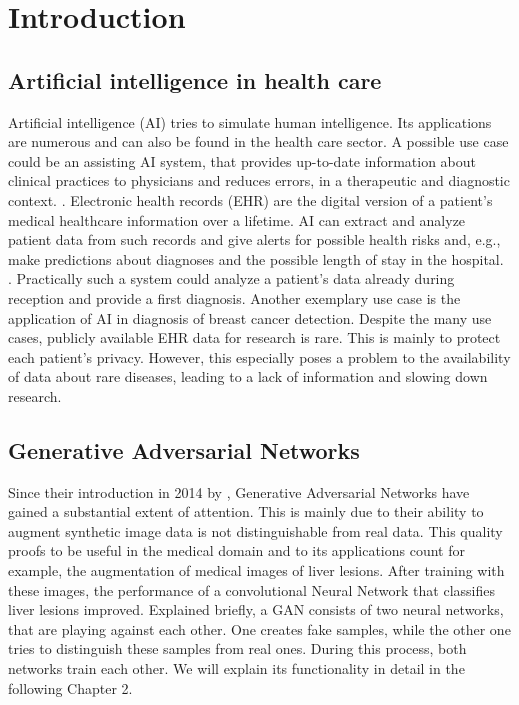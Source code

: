 \documentclass[11pt, a4paper, oneside]{book}
\begin{document}
\chapter{Introduction}

\section{Artificial intelligence in health care}
Artificial intelligence (AI) tries to simulate human intelligence. Its applications are numerous and can also be found in the health care sector. A possible use case could be an assisting AI system, that provides up-to-date information about clinical practices to physicians and reduces errors, in a therapeutic and diagnostic context. \citep{jiang2017artificial}. Electronic health records (EHR) are the digital version of a patient's medical healthcare information over a lifetime. AI can extract and analyze patient data from such records and give alerts for possible health risks and, e.g., make predictions about diagnoses and the possible length of stay in the hospital. \citep{neill2013using}. Practically such a system could analyze a patient's data already during reception and provide a first diagnosis. Another exemplary use case is the application of AI in diagnosis of breast cancer detection. \citep{ubeyli2007implementing} Despite the many use cases, publicly available EHR data for research is rare. This is mainly to protect each patient's privacy. However, this especially poses a problem to the availability of data about rare diseases, leading to a lack of information and slowing down research. \citep{bremond2015contribution}

\section{Generative Adversarial Networks}
Since their introduction in 2014 by \citep{Goodfellow2014}, Generative Adversarial Networks have gained a substantial extent of attention. This is mainly due to their ability to augment synthetic image data is not distinguishable from real data. This quality proofs to be useful in the medical domain and to its applications count for example, the augmentation of medical images of liver lesions. After training with these images, the performance of a convolutional Neural Network that classifies liver lesions improved. \citep{frid2018gan} Explained briefly, a GAN consists of two neural networks, that are playing against each other. One creates fake samples, while the other one tries to distinguish these samples from real ones. During this process, both networks train each other. \citep{Goodfellow2014} We will explain its functionality in detail in the following Chapter 2.
\end{document}
